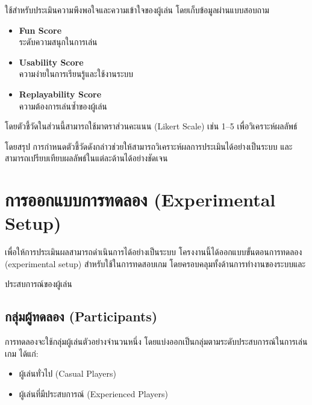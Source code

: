 ใช้สำหรับประเมินความพึงพอใจและความเข้าใจของผู้เล่น โดยเก็บข้อมูลผ่านแบบสอบถาม

\begin{itemize}
\item \textbf{Fun Score} \\
ระดับความสนุกในการเล่น

\item \textbf{Usability Score} \\
ความง่ายในการเรียนรู้และใช้งานระบบ

\item \textbf{Replayability Score} \\
ความต้องการเล่นซ้ำของผู้เล่น
\end{itemize}

\par\vspace{0.5em}\noindent
โดยตัวชี้วัดในส่วนนี้สามารถใช้มาตราส่วนคะแนน (Likert Scale) เช่น 1--5 เพื่อวิเคราะห์ผลลัพธ์

\par\vspace{0.5em}\noindent
โดยสรุป การกำหนดตัวชี้วัดดังกล่าวช่วยให้สามารถวิเคราะห์ผลการประเมินได้อย่างเป็นระบบ และสามารถเปรียบเทียบผลลัพธ์ในแต่ละด้านได้อย่างชัดเจน


\section{การออกแบบการทดลอง (Experimental Setup)}

เพื่อให้การประเมินผลสามารถดำเนินการได้อย่างเป็นระบบ โครงงานนี้ได้ออกแบบขั้นตอนการทดลอง (experimental setup) สำหรับใช้ในการทดสอบเกม โดยครอบคลุมทั้งด้านการทำงานของระบบและ
\par\vspace{0.5em}\noindent
ประสบการณ์ของผู้เล่น

\subsection{กลุ่มผู้ทดลอง (Participants)}

การทดลองจะใช้กลุ่มผู้เล่นตัวอย่างจำนวนหนึ่ง โดยแบ่งออกเป็นกลุ่มตามระดับประสบการณ์ในการเล่นเกม ได้แก่:

\begin{itemize}
\item ผู้เล่นทั่วไป (Casual Players)
\item ผู้เล่นที่มีประสบการณ์ (Experienced Players)
\end{itemize}

